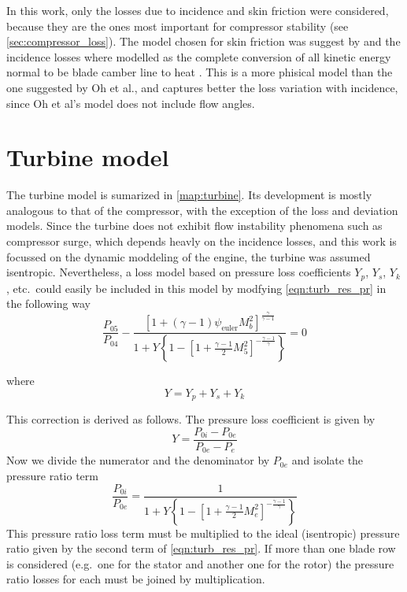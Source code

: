 \documentclass[tcc]{subfiles}
\begin{document}
In this work, only the losses due to incidence and skin friction were considered, because they are the ones most important for compressor stability (see \cref{sec:compressor_loss}). The model chosen for skin friction was suggest by \textcite{Oh1997} and the incidence losses where modelled as the complete conversion of all kinetic energy normal to be blade camber line to heat \cite{Galvas1973}. This is a more phisical model than the one suggested by Oh et al., and captures better the loss variation with incidence, since Oh et al's model does not include flow angles. 


\section{Turbine model}


The turbine model is sumarized in \cref{map:turbine}. 
Its development is mostly analogous to that of the compressor, with the exception of the loss and deviation models. 
Since the turbine does not exhibit flow instability phenomena such as compressor surge, 
which depends heavly on the incidence losses, 
and this work is focussed on the dynamic moddeling of the engine, 
the turbine was assumed isentropic. 
Nevertheless, a loss model based on pressure loss coefficients $Y_p$, $Y_s$, $Y_k$, etc.\ 
could easily be included in this model by modfying \cref{eqn:turb_res_pr} in the following way
\begin{equation}
    \frac{P_{05}}{P_{04}} -\frac{[1 + (\gamma-1)\psi_{\text{euler}} M_b^2]^{\frac{\gamma}{\gamma-1}}}{1+Y\left\{1-\left[1+\tfrac{\gamma-1}{2}M_5^2\right]^{-\frac{\gamma-1}{\gamma}}\right\}} = 0 
\end{equation}

where
\begin{equation}
    Y = Y_p + Y_s + Y_k
\end{equation}

This correction is derived as follows. The pressure loss coefficient is given by
\begin{equation}
    Y = \frac{P_{0i} - P_{0e}}{P_{0e} - P_e}
\end{equation}
Now we divide the numerator and the denominator by $P_{0e}$ and isolate the pressure ratio term 
\begin{equation}
    \frac{P_{0i}}{P_{0e}} = \frac{1}{1+Y\left\{1-\left[1+\tfrac{\gamma-1}{2}M_e^2\right]^{-\frac{\gamma-1}{\gamma}}\right\}}
\end{equation}
This pressure ratio loss term must be multiplied to the ideal (isentropic) pressure ratio given by the second term of \cref{eqn:turb_res_pr}. If more than one blade row is considered (e.g.\ one for the stator and another one for the rotor) the pressure ratio losses for each must be joined by multiplication.
\end{document}
